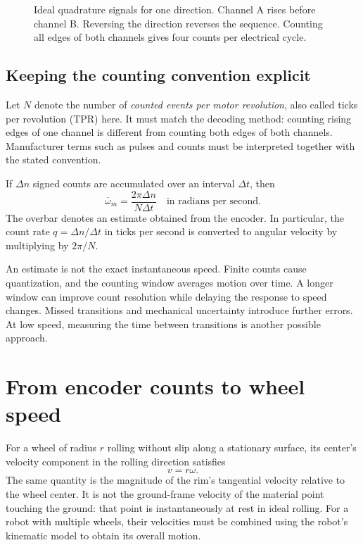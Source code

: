\begin{figure}[htbp]
\centering
\caption{Ideal quadrature signals for one direction. Channel A rises before
channel B. Reversing the direction reverses the sequence. Counting all edges
of both channels gives four counts per electrical cycle.}
\end{figure}

\subsection{Keeping the counting convention explicit}
Let $N$ denote the number of \emph{counted events per motor revolution},
also called ticks per revolution (TPR) here. It must match the decoding
method: counting rising edges of one channel is different from counting
both edges of both channels. Manufacturer terms such as pulses and counts
must be interpreted together with the stated convention.

If $\Delta n$ signed counts are accumulated over an interval $\Delta t$, then
\begin{equation}
 \overline\omega_m=\frac{2\pi\Delta n}{N\Delta t}
 \quad\text{in radians per second}.
 \label{eq:l08-encoder}
\end{equation}
The overbar denotes an estimate obtained from the encoder. In particular,
the count rate $q=\Delta n/\Delta t$ in ticks per second is converted to
angular velocity by multiplying by $2\pi/N$.

An estimate is not the exact instantaneous speed. Finite counts cause
quantization, and the counting window averages motion over time. A longer
window can improve count resolution while delaying the response to speed
changes. Missed transitions and mechanical uncertainty introduce further
errors. At low speed, measuring the time between transitions is another
possible approach.

\section{From encoder counts to wheel speed}
For a wheel of radius $r$ rolling without slip along a stationary surface,
its center's velocity component in the rolling direction satisfies
\begin{equation}
 v=r\omega.
 \label{eq:l08-rolling}
\end{equation}
The same quantity is the magnitude of the rim's tangential velocity relative
to the wheel center. It is not the ground-frame velocity of the material
point touching the ground: that point is instantaneously at rest in ideal
rolling. For a robot with multiple wheels, their velocities must be combined
using the robot's kinematic model to obtain its overall motion.

